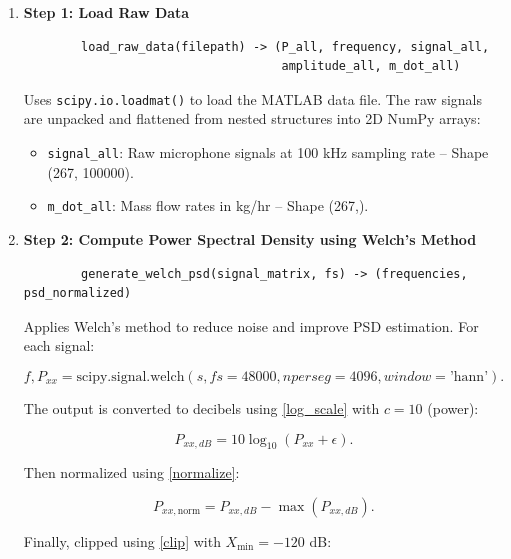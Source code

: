 \begin{enumerate}
    \item \textbf{Step 1: Load Raw Data} \\ 
    \begin{verbatim}
        load_raw_data(filepath) -> (P_all, frequency, signal_all, 
                                    amplitude_all, m_dot_all)
    \end{verbatim} 

    Uses \verb|scipy.io.loadmat()| to load the MATLAB data file. The raw signals are unpacked and flattened 
    from nested structures into 2D NumPy arrays:
    \begin{itemize}
        \item \verb|signal_all|: Raw microphone signals at 100 kHz sampling rate -- Shape (267, 100000).
        \item \verb|m_dot_all|: Mass flow rates in kg/hr -- Shape (267,).  
    \end{itemize}

    \item \textbf{Step 2: Compute Power Spectral Density using Welch's Method} \\
    \begin{verbatim}
        generate_welch_psd(signal_matrix, fs) -> (frequencies, psd_normalized)
    \end{verbatim}

    Applies Welch's method to reduce noise and improve PSD estimation. For each signal:

    \begin{equation}\label{welch_psd}
        f, P_{xx} = \text{scipy.signal.welch}(s, fs=48000, nperseg=4096, window=\text{'hann'}).
    \end{equation}

    The output is converted to decibels using \eqref{log_scale} with $c=10$ (power):

    \begin{equation}\label{psd_db}
        P_{xx,dB} = 10 \log_{10}(P_{xx} + \epsilon).
    \end{equation}

    Then normalized using \eqref{normalize}:

    \begin{equation}\label{psd_normalized}
        P_{xx,\text{norm}} = P_{xx,dB} - \max(P_{xx,dB}).
    \end{equation}

    Finally, clipped using \eqref{clip} with $X_{\min} = -120$ dB:


\end{enumerate}
